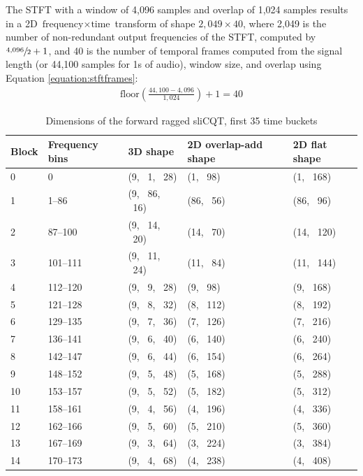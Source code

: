 \documentclass[report.tex]{subfiles}
\begin{document}
The STFT with a window of 4,096 samples and overlap of 1,024 samples results in a 2D $\text{frequency} \times \text{time}$ transform of shape $2{,}049 \times 40$, where 2,049 is the number of non-redundant output frequencies of the STFT, computed by $\sfrac{4{,}096}{2} + 1$, and 40 is the number of temporal frames computed from the signal length (or 44,100 samples for 1s of audio), window size, and overlap using Equation \ref{equation:stftframes}:
\begin{align}
	\text{floor}(\frac{44{,}100-4{,}096}{1{,}024}) + 1 = 40\tag{37}\label{equation:stftframes}
\end{align}

\begin{table}[ht]
	\centering
	\caption{Dimensions of the forward ragged sliCQT, first 35 time buckets}
	\label{table:slicqdim1}
	\begin{tabular}{ |l|l|l|l|l| }
	 \hline
		Block & Frequency bins & 3D shape & 2D overlap-add shape & 2D flat shape \\
	 \hline
	 \hline
0 & 0 & (9, \ 1, \ 28) & (1, \ 98) & (1, \ 168) \\
\hline
1 & 1--86 & (9, \ 86, \ 16) & (86, \ 56) & (86, \ 96) \\
\hline
2 & 87--100 & (9, \ 14, \ 20) & (14, \ 70) & (14, \ 120) \\
\hline
3 & 101--111 & (9, \ 11, \ 24) & (11, \ 84) & (11, \ 144) \\
\hline
4 & 112--120 & (9, \ 9, \ 28) & (9, \ 98) & (9, \ 168) \\
\hline
5 & 121--128 & (9, \ 8, \ 32) & (8, \ 112) & (8, \ 192) \\
\hline
6 & 129--135 & (9, \ 7, \ 36) & (7, \ 126) & (7, \ 216) \\
\hline
7 & 136--141 & (9, \ 6, \ 40) & (6, \ 140) & (6, \ 240) \\
\hline
8 & 142--147 & (9, \ 6, \ 44) & (6, \ 154) & (6, \ 264) \\
\hline
9 & 148--152 & (9, \ 5, \ 48) & (5, \ 168) & (5, \ 288) \\
\hline
10 & 153--157 & (9, \ 5, \ 52) & (5, \ 182) & (5, \ 312) \\
\hline
11 & 158--161 & (9, \ 4, \ 56) & (4, \ 196) & (4, \ 336) \\
\hline
12 & 162--166 & (9, \ 5, \ 60) & (5, \ 210) & (5, \ 360) \\
\hline
13 & 167--169 & (9, \ 3, \ 64) & (3, \ 224) & (3, \ 384) \\
\hline
14 & 170--173 & (9, \ 4, \ 68) & (4, \ 238) & (4, \ 408) \\

\end{tabular}
\end{table}
\end{document}
